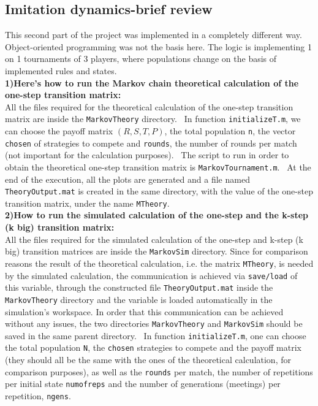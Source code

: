\documentclass[12pt]{article}
\begin{document}
\subsection{Imitation dynamics-brief review }
This second part of the project was implemented in a completely different way. Object-oriented programming was not the basis here. The logic is implementing 1 on 1 tournaments of 3 players, where populations change on the basis of implemented rules and states.
\\ \textbf{1)Here's how to run the Markov chain theoretical calculation of the one-step transition matrix:}
\\
 All the files required for the theoretical calculation of the one-step transition matrix are inside the \texttt{MarkovTheory} directory.
\
In function \texttt{initializeT.m}, we can choose the payoff matrix $(R, S, T, P)$, the total population \texttt{n}, the vector \texttt{chosen} of strategies to compete and \texttt{rounds}, the number of rounds per match (not important for the calculation purposes).
\
The script to run in order to obtain the theoretical one-step transition matrix is \texttt{MarkovTournament.m}.
\
At the end of the execution, all the plots are generated and a file named \texttt{TheoryOutput.mat} is created in the same directory, with the value of the one-step transition matrix, under the name \texttt{MTheory}.
\\
\textbf{2)How to run the simulated calculation of the one-step and the k-step (k big) transition matrix:}
\\
All the files required for the simulated calculation of the one-step and k-step (k big) transition matrices are inside the \texttt{MarkovSim} directory. Since for comparison reasons the result of the theoretical calculation, i.e. the matrix \texttt{MTheory}, is needed by the simulated calculation, the communication is achieved via \texttt{save/load} of this variable, through the constructed file \texttt{TheoryOutput.mat} inside the \texttt{MarkovTheory} directory and the variable is loaded automatically in the simulation’s workspace. In order that this communication can be achieved without any issues, the two directories \texttt{MarkovTheory} and \texttt{MarkovSim} should be saved in the same parent directory.
\
In function \texttt{initializeT.m}, one can choose the total population \texttt{N}, the \texttt{chosen} strategies to compete and the payoff matrix (they should all be the same with the ones of the theoretical calculation, for comparison purposes), as well as the \texttt{rounds} per match, the number of repetitions per initial state \texttt{numofreps} and the number of generations (meetings) per repetition, \texttt{ngens}. 
\end{document}
